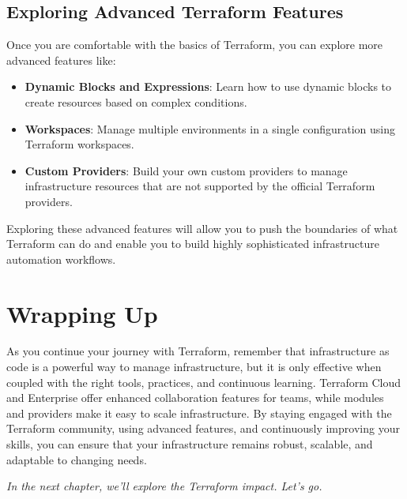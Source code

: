 \subsection{Exploring Advanced Terraform Features}

Once you are comfortable with the basics of Terraform, you can explore more advanced features like:

\begin{itemize}
  \item \textbf{Dynamic Blocks and Expressions}: Learn how to use dynamic blocks to create resources based on complex conditions.
  \item \textbf{Workspaces}: Manage multiple environments in a single configuration using Terraform workspaces.
  \item \textbf{Custom Providers}: Build your own custom providers to manage infrastructure resources that are not supported by the official Terraform providers.
\end{itemize}

Exploring these advanced features will allow you to push the boundaries of what Terraform can do and enable you to build highly sophisticated infrastructure automation workflows.

\section{Wrapping Up}

As you continue your journey with Terraform, remember that infrastructure as code is a powerful way to manage infrastructure, but it is only effective when coupled with the right tools, practices, and continuous learning. Terraform Cloud and Enterprise offer enhanced collaboration features for teams, while modules and providers make it easy to scale infrastructure. By staying engaged with the Terraform community, using advanced features, and continuously improving your skills, you can ensure that your infrastructure remains robust, scalable, and adaptable to changing needs.

\vspace{1em}

\textit{In the next chapter, we'll explore the Terraform impact. Let's go.}
